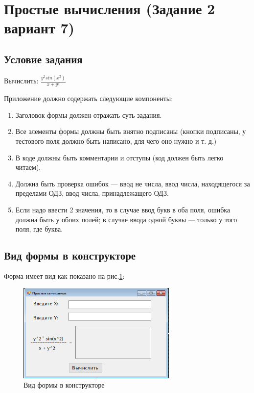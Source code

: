 \section{Простые вычисления (Задание 2 вариант 7)}

\subsection{Условие задания}

Вычислить: $\frac{y^2 sin (x^2)}{x + y^2}$

Приложение должно содержать следующие компоненты:

\begin{enumerate}
    \item{Заголовок формы должен отражать суть задания.}
    \item{Все элементы формы должны быть внятно подписаны (кнопки подписаны, у тестового поля должно быть написано, для чего оно нужно и т. д.)}
    \item{В коде должны быть комментарии и отступы (код должен быть легко читаем).}
    \item{Должна быть проверка ошибок --- ввод не числа, ввод числа, находящегося за пределами ОДЗ, ввод числа, принадлежащего ОДЗ.}
    \item{Если надо ввести 2 значения, то в случае ввод букв в оба поля, ошибка должна быть у обоих полей; в случае ввода одной буквы --- только у того поля, где буква.}
\end{enumerate}

\subsection{Вид формы в конструкторе}

Форма имеет вид как показано на рис.\ref{fig:FormInConstruct2}:

\begin{figure}[!h]
    \centering
    \includegraphics[width = 0.7\textwidth]{images/Task2/FormInConstructor.png}
    \caption{Вид формы в конструкторе}
    \label{fig:FormInConstruct2}
\end{figure}

